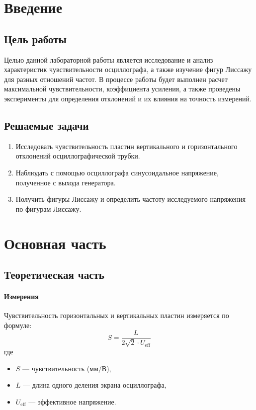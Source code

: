 

\section{Введение}
\subsection{Цель работы}
Целью данной лабораторной работы является исследование и анализ характеристик чувствительности осциллографа, а также изучение фигур Лиссажу для разных отношений частот. В процессе работы будет выполнен расчет максимальной чувствительности, коэффициента усиления, а также проведены эксперименты для определения отклонений и их влияния на точность измерений.

\subsection{Решаемые задачи}
\begin{enumerate}
  \item Исследовать чувствительность пластин вертикального и горизонтального отклонений осциллографической трубки. 
  \item Наблюдать с помощью осциллографа синусоидальное напряжение, полученное с выхода генератора. 
  \item Получить фигуры Лиссажу и определить частоту исследуемого напряжения по фигурам Лиссажу.
\end{enumerate}

\section{Основная часть}

\subsection{Теоретическая часть}

\paragraph{Измерения}
Чувствительность горизонтальных и вертикальных пластин измеряется по формуле:
\begin{equation}
S = \frac{L}{2 \sqrt{2} \cdot U_{\text{eff}}}
\end{equation}
где \begin{itemize}
    \item \( S \) — чувствительность (мм/В),
    \item \( L \) — длина одного деления экрана осциллографа,
    \item \( U_{\text{eff}} \) — эффективное напряжение.
\end{itemize}


